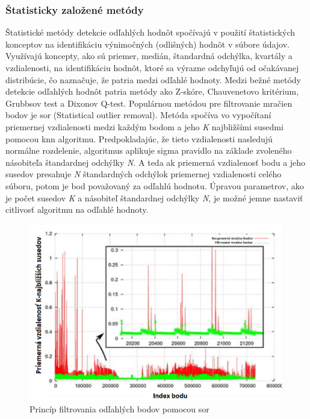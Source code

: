 \subsubsection{Štatisticky založené metódy} \label{section::sor}
\noindent Štatistické metódy detekcie odľahlých hodnôt spočívajú v použití štatistických konceptov na identifikáciu výnimočných (odlišných) hodnôt v súbore údajov. Využívajú koncepty, ako sú priemer, medián, štandardná odchýlka, kvartály a vzdialenosti, na identifikáciu hodnôt, ktoré sa výrazne odchyľujú od očakávanej distribúcie, čo naznačuje, že patria medzi odľahlé hodnoty. Medzi bežné metódy detekcie odľahlých hodnôt patria metódy ako Z-skóre, Chauvenetovo kritérium, Grubbsov test a Dixonov Q-test. 
\newline\indent Populárnou metódou pre filtrovanie mračien bodov je \acrshort{sor} (Statistical outlier removal). Metóda spočíva vo vypočítaní priemernej vzdialenosti medzi každým bodom a jeho \textit{K} najbližšími susedmi pomocou \acrshort{knn} algoritmu. Predpokladajúc, že tieto vzdialenosti nasledujú normálne rozdelenie, algoritmus aplikuje sigma pravidlo na základe zvoleného násobiteľa štandardnej odchýlky \textit{N}. A teda ak priemerná vzdialenosť bodu a jeho susedov presahuje \textit{N} štandardných odchýlok priemernej vzdialenosti celého súboru, potom je bod považovaný za odľahlú hodnotu. Úpravou parametrov, ako je počet susedov \textit{K} a násobiteľ štandardnej odchýlky \textit{N}, je možné jemne nastaviť citlivosť algoritmu na odľahlé hodnoty. \cite{statistical_filter} 
\begin{figure}[!htbp]
  \centering
  \includegraphics[width=14cm]{img/sor_principal.png}
  \caption{Princíp filtrovania odľahlých bodov pomocou \acrshort{sor} \cite{SOR_img}}
  \label{vzhladobr}
\end{figure}

